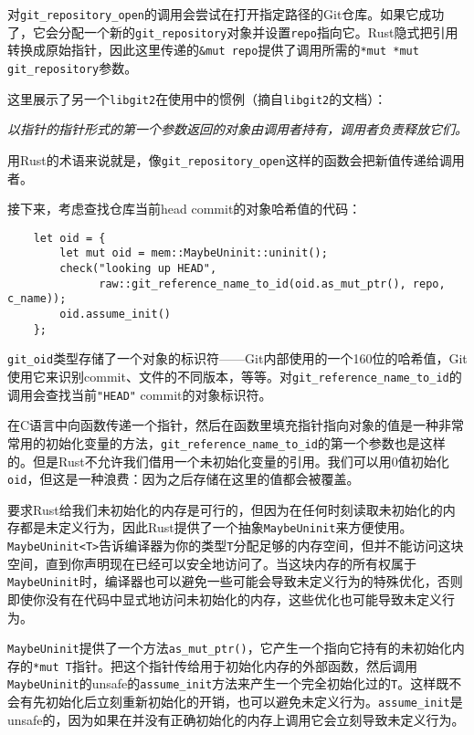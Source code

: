 对\texttt{git\_repository\_open}的调用会尝试在打开指定路径的Git仓库。如果它成功了，它会分配一个新的\texttt{git\_repository}对象并设置\texttt{repo}指向它。Rust隐式把引用转换成原始指针，因此这里传递的\texttt{\&mut repo}提供了调用所需的\texttt{*mut *mut git\_repository}参数。

这里展示了另一个\texttt{libgit2}在使用中的惯例（摘自\texttt{libgit2}的文档）：

\emph{以指针的指针形式的第一个参数返回的对象由调用者持有，调用者负责释放它们。}

用Rust的术语来说就是，像\texttt{git\_repository\_open}这样的函数会把新值传递给调用者。

接下来，考虑查找仓库当前head commit的对象哈希值的代码：
\begin{verbatim}
    let oid = {
        let mut oid = mem::MaybeUninit::uninit();
        check("looking up HEAD",
              raw::git_reference_name_to_id(oid.as_mut_ptr(), repo, c_name));
        oid.assume_init()
    };
\end{verbatim}

\texttt{git\_oid}类型存储了一个对象的标识符——Git内部使用的一个160位的哈希值，Git使用它来识别commit、文件的不同版本，等等。对\texttt{git\_reference\_name\_to\_id}的调用会查找当前\texttt{"HEAD"} commit的对象标识符。

在C语言中向函数传递一个指针，然后在函数里填充指针指向对象的值是一种非常常用的初始化变量的方法，\texttt{git\_reference\_name\_to\_id}的第一个参数也是这样的。但是Rust不允许我们借用一个未初始化变量的引用。我们可以用0值初始化\texttt{oid}，但这是一种浪费：因为之后存储在这里的值都会被覆盖。

要求Rust给我们未初始化的内存是可行的，但因为在任何时刻读取未初始化的内存都是未定义行为，因此Rust提供了一个抽象\texttt{MaybeUninit}来方便使用。\texttt{MaybeUninit<T>}告诉编译器为你的类型\texttt{T}分配足够的内存空间，但并不能访问这块空间，直到你声明现在已经可以安全地访问了。当这块内存的所有权属于\texttt{MaybeUninit}时，编译器也可以避免一些可能会导致未定义行为的特殊优化，否则即使你没有在代码中显式地访问未初始化的内存，这些优化也可能导致未定义行为。

\texttt{MaybeUninit}提供了一个方法\texttt{as\_mut\_ptr()}，它产生一个指向它持有的未初始化内存的\texttt{*mut T}指针。把这个指针传给用于初始化内存的外部函数，然后调用\texttt{MaybeUninit}的unsafe的\texttt{assume\_init}方法来产生一个完全初始化过的\texttt{T}。这样既不会有先初始化后立刻重新初始化的开销，也可以避免未定义行为。\texttt{assume\_init}是unsafe的，因为如果在并没有正确初始化的内存上调用它会立刻导致未定义行为。

